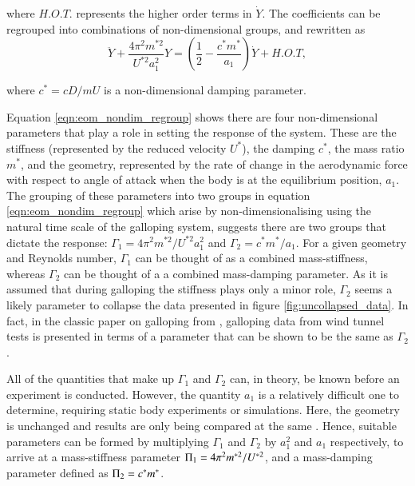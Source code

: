  where $H.O.T.$ represents the higher order terms in $\dot{Y}$. The coefficients can be regrouped into combinations of non-dimensional groups, and rewritten as
 \begin{equation}
   \label{eqn:eom_nondim_regroup}
   \ddot{Y} + \frac{4\pi^{2}m^{*2}}{U^{*2}a_1^2}Y = \left(\frac{1}{2} - \frac{c^*m^*}{a_1}\right)\dot{Y} + H.O.T,
 \end{equation}
 
 where $c^*=cD/mU$ is a non-dimensional damping parameter.
 
 Equation \ref{eqn:eom_nondim_regroup} shows there are four non-dimensional parameters that play a role in setting the response of the system. These are the stiffness (represented by the reduced velocity $U^*$), the damping $c^*$, the mass ratio $m^*$, and the geometry, represented by the rate of change in the aerodynamic force with respect to angle of attack when the body is at the equilibrium position, $a_1$. The grouping of these parameters into two groups in equation \ref{eqn:eom_nondim_regroup} which arise by non-dimensionalising using the natural time scale of the galloping system, suggests there are two groups that dictate the response: $\Gamma_1 = 4\pi^2m^{*2}/U^{*2}a_1^2$ and $\Gamma_2 = c^*m^*/a_1$. For a given geometry and Reynolds number, $\Gamma_1$ can be thought of as a combined mass-stiffness, whereas $\Gamma_2$ can be thought of a a combined mass-damping parameter. As it is assumed that during galloping the stiffness plays only a minor role, $\Gamma_2$ seems a likely parameter to collapse the data presented in figure \ref{fig:uncollapsed_data}. In fact, in the classic paper on galloping from \citet{Parkinson1964}, galloping data from wind tunnel tests is presented in terms of a parameter that can be shown to be the same as $\Gamma_2$.
 
 All of the quantities that make up $\Gamma_1$ and $\Gamma_2$ can, in theory, be known before an experiment is conducted. However, the quantity $a_1$ is a relatively difficult one to determine, requiring static body experiments or simulations. Here, the geometry is unchanged and results are only being compared at the same \reynoldsnumber. Hence, suitable parameters can be formed by multiplying $\Gamma_1$ and $\Gamma_2$ by $a_1^2$ and $a_1$ respectively, to arrive at a mass-stiffness parameter $\Pi_1 =  4\pi^2m^{*2}/U^{*2}$, and a mass-damping parameter defined as $\Pi_2 = c^*m^*$.
 
  

